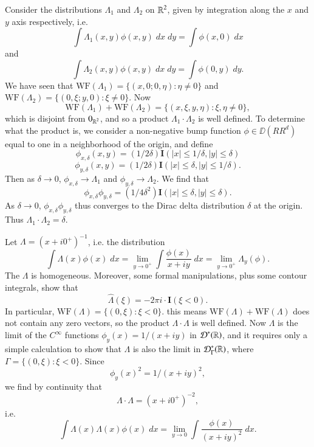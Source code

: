 \begin{example}
    Consider the distributions $\Lambda_1$ and $\Lambda_2$ on $\operatorname{\mathbb{R}}^2$, given by integration along the $x$ and $y$ axis respectively, i.e.
    \[ \int \Lambda_1(x,y) \phi(x,y)\; dx\; dy = \int \phi(x,0)\; dx \]
    and
    \[ \int \Lambda_2(x,y) \phi(x,y)\; dx\; dy = \int \phi(0,y)\; dy. \]
    We have seen that $\text{WF}(\Lambda_1) = \{ (x,0;0,\eta) : \eta \neq 0 \}$ and $\text{WF}(\Lambda_2) = \{ (0,\xi;y,0) : \xi \neq 0 \}$. Now
    \[ \text{WF}(\Lambda_1) + \text{WF}(\Lambda_2) = \{ (x,\xi,y,\eta): \xi, \eta \neq 0 \}, \]
    which is disjoint from $0_{\operatorname{\mathbb{R}}^2}$, and so a product $\Lambda_1 \cdot \Lambda_2$ is well defined. To determine what the product is, we consider a non-negative bump function $\phi \in \DD(RR^d)$ equal to one in a neighborhood of the origin, and define
    \[ \phi_{x,\delta}(x,y) = (1/2\delta) \mathbf{I}(|x| \leq 1/\delta, |y| \leq \delta) \]
    \[ \phi_{y,\delta}(x,y) = (1/2\delta) \mathbf{I}(|x| \leq \delta, |y| \leq 1/\delta). \]
    Then as $\delta \to 0$, $\phi_{x,\delta} \to \Lambda_1$ and $\phi_{y,\delta} \to \Lambda_2$. We find that
    \[ \phi_{x,\delta} \phi_{y,\delta} = (1/4\delta^2) \mathbf{I}(|x| \leq \delta, |y| \leq \delta). \]
    As $\delta \to 0$, $\phi_{x,\delta} \phi_{y,\delta}$ thus converges to the Dirac delta distribution $\delta$ at the origin. Thus $\Lambda_1 \cdot \Lambda_2 = \delta$.
\end{example}

\begin{example}
    Let $\Lambda = (x + i0^+)^{-1}$, i.e. the distribution
    \[ \int \Lambda(x) \phi(x)\; dx = \lim_{y \to 0^+} \int \frac{\phi(x)}{x + iy}\; dx = \lim_{y \to 0^+} \Lambda_y(\phi). \]
    The $\Lambda$ is homogeneous. Moreover, some formal manipulations, plus some contour integrals, show that
    \[ \widehat{\Lambda}(\xi) = - 2 \pi i \cdot \mathbf{I}(\xi < 0). \]
    In particular, $\text{WF}(\Lambda) = \{ (0,\xi) : \xi < 0 \}$. this means $\text{WF}(\Lambda) + \text{WF}(\Lambda)$ does not contain any zero vectors, so the product $\Lambda \cdot \Lambda$ is well defined. Now $\Lambda$ is the limit of the $C^\infty$ functions $\phi_y(x) = 1/(x + iy)$ in $\operatorname{\mathcal{D}}^*(\operatorname{\mathbb{R}})$, and it requires only a simple calculation to show that $\Lambda$ is also the limit in $\operatorname{\mathcal{D}}^*_\Gamma(\operatorname{\mathbb{R}})$, where $\Gamma = \{ (0,\xi): \xi < 0 \}$. Since
    \[ \phi_y(x)^2 = 1/(x + iy)^2, \]
    we find by continuity that
    \[ \Lambda \cdot \Lambda = (x + i0^+)^{-2}, \]
    i.e.
    \[ \int \Lambda(x) \Lambda(x) \phi(x)\; dx = \lim_{y \to 0} \int \frac{\phi(x)}{(x + iy)^2}\; dx. \]
\end{example}

